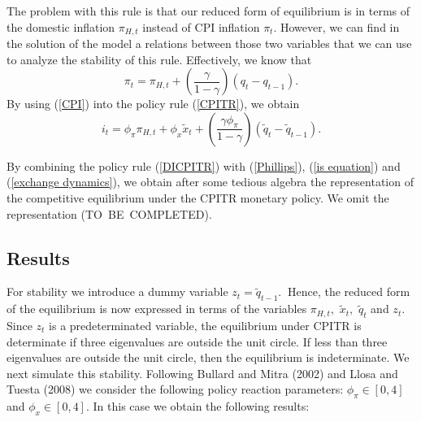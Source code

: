 \documentclass{article}
\begin{document}
The problem with this rule is that our reduced form of equilibrium is in
terms of the domestic inflation $\pi _{H,t}$ instead of CPI inflation $\pi
_{t}.$ However, we can find in the solution of the model a relations between
those two variables that we can use to analyze the stability of this rule.
Effectively, we know that%
\begin{equation}
\pi _{t}=\pi _{H,t}+\left( \frac{\gamma }{1-\gamma }\right) \left(
q_{t}-q_{t-1}\right) .  \label{CPI}
\end{equation}%
By using (\ref{CPI}) into  the policy rule (\ref{CPITR}), we obtain%
\begin{equation}
i_{t}=\phi _{\pi }\pi _{H,t}+\phi _{x}\widetilde{x}_{t}+\left( \frac{\gamma
\phi _{\pi }}{1-\gamma }\right) \left( \widetilde{q}_{t}-\widetilde{q}%
_{t-1}\right) .  \label{DICPITR}
\end{equation}

By combining the policy rule (\ref{DICPITR}) with (\ref{Phillips}), (\ref{is
equation}) and (\ref{exchange dynamics}), we obtain after some tedious
algebra the representation of the competitive equilibrium under the CPITR
monetary policy. We omit the representation (TO\ BE\ COMPLETED).

\subsection{Results}

For stability we introduce a dummy variable $z_{t}=\widetilde{q}_{t-1}.\ $%
Hence, the reduced form of the equilibrium is now expressed in terms of the
variables $\pi _{H,t},$ $\widetilde{x}_{t},$ $\widetilde{q}_{t}$ and $z_{t}.$
Since $z_{t}$ is a predeterminated variable, the equilibrium under CPITR is
determinate if three eigenvalues are outside the unit circle. If less than
three eigenvalues are outside the unit circle, then the equilibrium is
indeterminate. We next simulate this stability. Following Bullard and Mitra
(2002) and Llosa and Tuesta (2008) we consider the following policy reaction
parameters: $\phi _{\pi }\in \left[ 0,4\right] $ and $\phi _{x}\in \left[ 0,4%
\right] .$ In this case we obtain the following results:
\end{document}
